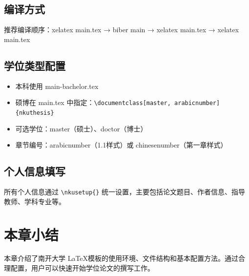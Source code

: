 \subsection{编译方式}

推荐编译顺序：xelatex main.tex → biber main → xelatex main.tex → xelatex main.tex

\subsection{学位类型配置}

\begin{itemize}
    \item 本科使用 main-bachelor.tex
    \item 硕博在 main.tex 中指定：\texttt{\textbackslash documentclass[master, arabicnumber]\{nkuthesis\}}
    \item 可选学位：master（硕士）、doctor（博士）
    \item 章节编号：arabicnumber（1.1样式）或 chinesenumber（第一章样式）
\end{itemize}

\subsection{个人信息填写}

所有个人信息通过 \texttt{\textbackslash nkusetup\{\}} 统一设置，主要包括论文题目、作者信息、指导教师、学科专业等。

\section{本章小结}

本章介绍了南开大学 \LaTeX 模板的使用环境、文件结构和基本配置方法。通过合理配置，用户可以快速开始学位论文的撰写工作。

